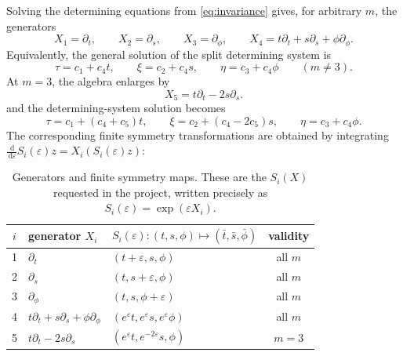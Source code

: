 \documentclass[11pt]{article}
\newcommand{\eps}{\varepsilon}
\newcommand{\dd}{\,\mathrm d}
\begin{document}
Solving the determining equations from \cref{eq:invariance} gives, for arbitrary $m$, the generators
\begin{equation}
 X_1=\partial_t,
 \qquad X_2=\partial_s,
 \qquad X_3=\partial_\phi,
 \qquad X_4=t\partial_t+s\partial_s+\phi\partial_\phi.
 \label{eq:generic-generators}
\end{equation}
Equivalently, the general solution of the split determining system is
\begin{equation}
 \tau=c_1+c_4t,\qquad
 \xi=c_2+c_4s,\qquad
 \eta=c_3+c_4\phi
 \qquad (m\ne3).
 \label{eq:generic-determining-solution}
\end{equation}
At $m=3$, the algebra enlarges by
\begin{equation}
 X_5=t\partial_t-2s\partial_s.
 \label{eq:X5}
\end{equation}
and the determining-system solution becomes
\begin{equation}
 \tau=c_1+(c_4+c_5)t,\qquad
 \xi=c_2+(c_4-2c_5)s,\qquad
 \eta=c_3+c_4\phi.
 \label{eq:special-determining-solution}
\end{equation}
The corresponding finite symmetry transformations are obtained by integrating
$\frac{\dd}{\dd\eps}S_i(\eps)z=X_i(S_i(\eps)z)$:
\begin{table}[ht]
\centering
\caption{Generators and finite symmetry maps.  These are the $S_i(X)$ requested in the project, written precisely as $S_i(\eps)=\exp(\eps X_i)$.}
\label{tab:finite-maps}
\begin{tabularx}{\textwidth}{@{}c l X c@{}}
\toprule
$i$ & generator $X_i$ & $S_i(\eps):(t,s,\phi)\mapsto(\bar t,\bar s,\bar\phi)$ & validity\\
\midrule
1 & $\partial_t$ & $(t+\eps,s,\phi)$ & all $m$\\
2 & $\partial_s$ & $(t,s+\eps,\phi)$ & all $m$\\
3 & $\partial_\phi$ & $(t,s,\phi+\eps)$ & all $m$\\
4 & $t\partial_t+s\partial_s+\phi\partial_\phi$
  & $(e^\eps t,e^\eps s,e^\eps\phi)$ & all $m$\\
5 & $t\partial_t-2s\partial_s$
  & $(e^\eps t,e^{-2\eps}s,\phi)$ & $m=3$\\
\bottomrule
\end{tabularx}
\end{table}
\end{document}
